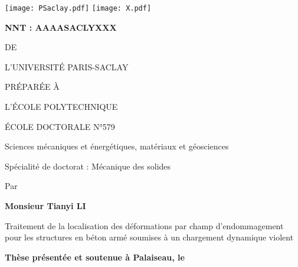 
\begin{titlepage}

\begin{flushleft}
\texttt{[image: PSaclay.pdf]} \hfill
\texttt{[image: X.pdf]}
\end{flushleft}
\vspace{10pt}

\begin{mdframed}
\begin{flushleft}
\large\textbf{NNT : AAAASACLYXXX}
\end{flushleft}
\vspace{20pt}

\begin{center}
{\color{color02}{\LARGE THÈSE DE DOCTORAT}

\vspace{8pt}
{\LARGE DE}

\vspace{8pt}
{\LARGE L'UNIVERSITÉ PARIS-SACLAY}

\vspace{8pt}
{\LARGE PRÉPARÉE À}

\vspace{8pt}
{\LARGE L'ÉCOLE POLYTECHNIQUE}}

\vspace{24pt}
{\Large ÉCOLE DOCTORALE N°579}

\vspace{5pt}
{\Large Sciences mécaniques et énergétiques, matériaux et géosciences}

\vspace{16pt}
{\Large Spécialité de doctorat : Mécanique des solides}
\vspace{12pt}

{\large Par}
\vspace{12pt}

{\LARGE\bfseries Monsieur Tianyi LI}
\vspace{20pt}

{\Large
Traitement de la localisation des déformations par champ d'endommagement pour les structures en béton armé soumises à un chargement dynamique violent}
\end{center}

\vfill
\begin{flushleft}
\large
\textbf{Thèse présentée et soutenue à Palaiseau, le}
\vspace{15pt}


\end{flushleft}
\end{mdframed}
\end{titlepage}
